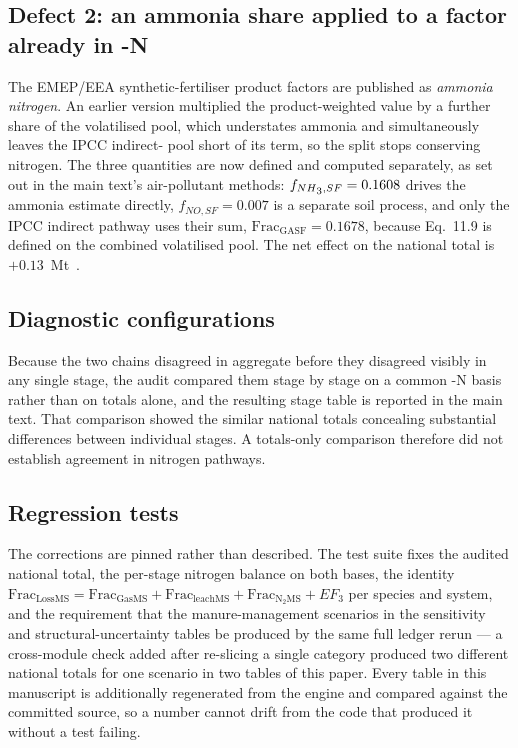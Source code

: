 \subsection*{Defect 2: an ammonia share applied to a factor already in \NHthree{}-N}

The EMEP/EEA synthetic-fertiliser product factors are published as \emph{ammonia
nitrogen}. An earlier version multiplied the product-weighted value by a further
\NHthree{} share of the volatilised pool, which understates ammonia and simultaneously
leaves the IPCC indirect-\NtwoO{} pool short of its \NOx{} term, so the split stops
conserving nitrogen. The three quantities are now defined and computed separately, as set
out in the main text's air-pollutant methods: $f_{NH\textsubscript{3}{},SF}=0.1608$ drives the ammonia
estimate directly, $f_{NO,SF}=0.007$ is a separate soil process, and only the IPCC
indirect pathway uses their sum, $\mathrm{Frac_{GASF}}=0.1678$, because Eq.~11.9 is
defined on the combined volatilised pool. The net effect on the national total is
$+0.13$~Mt~\COe{}.

\subsection*{Diagnostic configurations}

Because the two chains disagreed in aggregate before they disagreed visibly in any single
stage, the audit compared them stage by stage on a common \NHthree{}-N basis rather than
on totals alone, and the resulting stage table is reported in the main text. That comparison showed the
similar national totals concealing substantial differences between individual
stages. A totals-only comparison therefore did not establish agreement in nitrogen
pathways.

\subsection*{Regression tests}

The corrections are pinned rather than described. The test suite fixes the audited
national total, the per-stage nitrogen balance on both bases, the identity
$\mathrm{Frac_{LossMS}} = \mathrm{Frac_{GasMS}} + \mathrm{Frac_{leachMS}} +
\mathrm{Frac_{N_2MS}} + EF_3$ per species and system, and the requirement that the
manure-management scenarios in the sensitivity and structural-uncertainty tables be
produced by the same full ledger rerun --- a cross-module check added after re-slicing a
single category produced two different national totals for one scenario in two tables of
this paper. Every table in this manuscript is additionally regenerated from the engine and
compared against the committed source, so a number cannot drift from the code that
produced it without a test failing.
